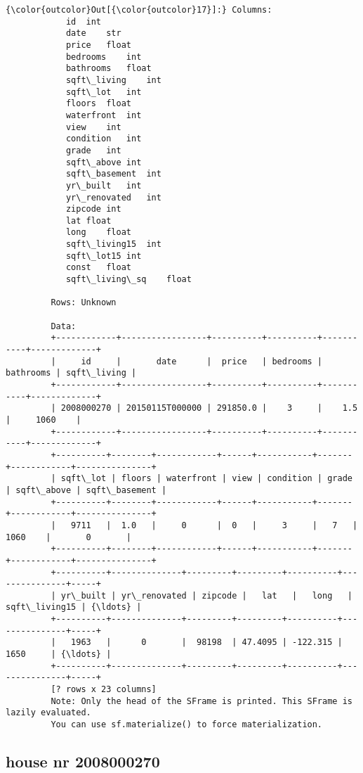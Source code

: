 \documentclass[11pt]{article}
\begin{document}
\begin{Verbatim}[commandchars=\\\{\}]
{\color{outcolor}Out[{\color{outcolor}17}]:} Columns:
         	id	int
         	date	str
         	price	float
         	bedrooms	int
         	bathrooms	float
         	sqft\_living	int
         	sqft\_lot	int
         	floors	float
         	waterfront	int
         	view	int
         	condition	int
         	grade	int
         	sqft\_above	int
         	sqft\_basement	int
         	yr\_built	int
         	yr\_renovated	int
         	zipcode	int
         	lat	float
         	long	float
         	sqft\_living15	int
         	sqft\_lot15	int
         	const	float
         	sqft\_living\_sq	float
         
         Rows: Unknown
         
         Data:
         +------------+-----------------+----------+----------+-----------+-------------+
         |     id     |       date      |  price   | bedrooms | bathrooms | sqft\_living |
         +------------+-----------------+----------+----------+-----------+-------------+
         | 2008000270 | 20150115T000000 | 291850.0 |    3     |    1.5    |     1060    |
         +------------+-----------------+----------+----------+-----------+-------------+
         +----------+--------+------------+------+-----------+-------+------------+---------------+
         | sqft\_lot | floors | waterfront | view | condition | grade | sqft\_above | sqft\_basement |
         +----------+--------+------------+------+-----------+-------+------------+---------------+
         |   9711   |  1.0   |     0      |  0   |     3     |   7   |    1060    |       0       |
         +----------+--------+------------+------+-----------+-------+------------+---------------+
         +----------+--------------+---------+---------+----------+---------------+-----+
         | yr\_built | yr\_renovated | zipcode |   lat   |   long   | sqft\_living15 | {\ldots} |
         +----------+--------------+---------+---------+----------+---------------+-----+
         |   1963   |      0       |  98198  | 47.4095 | -122.315 |      1650     | {\ldots} |
         +----------+--------------+---------+---------+----------+---------------+-----+
         [? rows x 23 columns]
         Note: Only the head of the SFrame is printed. This SFrame is lazily evaluated.
         You can use sf.materialize() to force materialization.
\end{Verbatim}
            
    \subsection{house nr 2008000270}\label{house-nr-2008000270}
\end{document}
